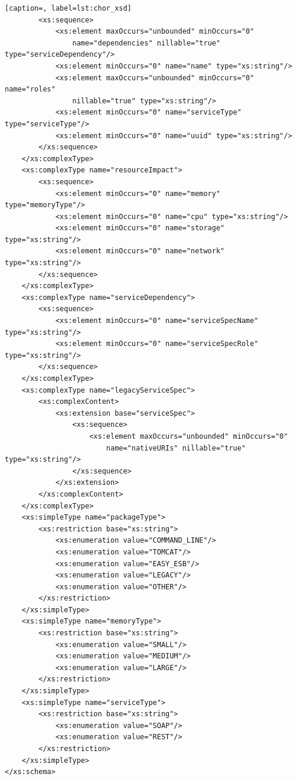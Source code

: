 \documentclass[a4paper, 10pt]{article}
\begin{document}
{\begin{lstlisting}[caption=, label=lst:chor_xsd]
        <xs:sequence>
            <xs:element maxOccurs="unbounded" minOccurs="0"
                name="dependencies" nillable="true" type="serviceDependency"/>
            <xs:element minOccurs="0" name="name" type="xs:string"/>
            <xs:element maxOccurs="unbounded" minOccurs="0" name="roles"
                nillable="true" type="xs:string"/>
            <xs:element minOccurs="0" name="serviceType" type="serviceType"/>
            <xs:element minOccurs="0" name="uuid" type="xs:string"/>
        </xs:sequence>
    </xs:complexType>
    <xs:complexType name="resourceImpact">
        <xs:sequence>
            <xs:element minOccurs="0" name="memory" type="memoryType"/>
            <xs:element minOccurs="0" name="cpu" type="xs:string"/>
            <xs:element minOccurs="0" name="storage" type="xs:string"/>
            <xs:element minOccurs="0" name="network" type="xs:string"/>
        </xs:sequence>
    </xs:complexType>
    <xs:complexType name="serviceDependency">
        <xs:sequence>
            <xs:element minOccurs="0" name="serviceSpecName" type="xs:string"/>
            <xs:element minOccurs="0" name="serviceSpecRole" type="xs:string"/>
        </xs:sequence>
    </xs:complexType>
    <xs:complexType name="legacyServiceSpec">
        <xs:complexContent>
            <xs:extension base="serviceSpec">
                <xs:sequence>
                    <xs:element maxOccurs="unbounded" minOccurs="0"
                        name="nativeURIs" nillable="true" type="xs:string"/>
                </xs:sequence>
            </xs:extension>
        </xs:complexContent>
    </xs:complexType>
    <xs:simpleType name="packageType">
        <xs:restriction base="xs:string">
            <xs:enumeration value="COMMAND_LINE"/>
            <xs:enumeration value="TOMCAT"/>
            <xs:enumeration value="EASY_ESB"/>
            <xs:enumeration value="LEGACY"/>
            <xs:enumeration value="OTHER"/>
        </xs:restriction>
    </xs:simpleType>
    <xs:simpleType name="memoryType">
        <xs:restriction base="xs:string">
            <xs:enumeration value="SMALL"/>
            <xs:enumeration value="MEDIUM"/>
            <xs:enumeration value="LARGE"/>
        </xs:restriction>
    </xs:simpleType>
    <xs:simpleType name="serviceType">
        <xs:restriction base="xs:string">
            <xs:enumeration value="SOAP"/>
            <xs:enumeration value="REST"/>
        </xs:restriction>
    </xs:simpleType>
</xs:schema>



\end{lstlisting}}
\end{document}
